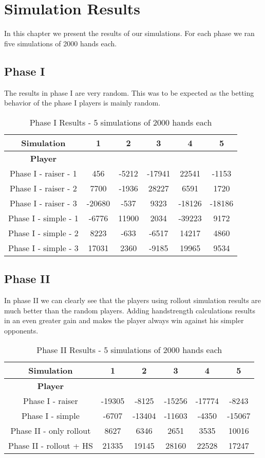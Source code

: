 \pagebreak

\section{Simulation Results}
In this chapter we present the results of our simulations. For each phase we ran five simulations of 2000 hands each.

\subsection{Phase I}
The results in phase I are very random. This was to be expected as the betting behavior of the phase I players is mainly
random.

\begin{table}[!h]
\center
\caption{Phase I Results - 5 simulations of 2000 hands each}
\begin{tabular}{ c | c c c c c}
    \textbf{Simulation} & 1 & 2 & 3 & 4 & 5 \\
    \hline
    \textbf{Player} \\
    Phase I - raiser - 1 & 456 & -5212 & -17941 & 22541  & -1153\\
    Phase I - raiser - 2 & 7700 & -1936 & 28227 & 6591   & 1720\\
    Phase I - raiser - 3 & -20680 & -537 & 9323 & -18126 & -18186\\
    Phase I - simple - 1 & -6776 & 11900 & 2034 & -39223 & 9172\\
    Phase I - simple - 2 & 8223 & -633 & -6517 & 14217   & 4860\\
    Phase I - simple - 3 & 17031 & 2360 & -9185 & 19965  & 9534\\
\end{tabular}
\end{table}

\subsection{Phase II}
In phase II we can clearly see that the players using rollout simulation results are much better than the random
players. Adding handstrength calculations results in an even greater gain and makes the player always win against his
simpler opponents.

\begin{table}[!h]
\center
\caption{Phase II Results - 5 simulations of 2000 hands each}
\begin{tabular}{ c | c c c c c}
    \textbf{Simulation} & 1 & 2 & 3 & 4 & 5 \\
    \hline
    \textbf{Player} \\
    Phase I - raiser        & -19305 & -8125 & -15256 & -17774 & -8243\\
    Phase I - simple        & -6707 & -13404 & -11603 & -4350  & -15067\\
    Phase II - only rollout & 8627  & 6346  & 2651    & 3535   & 10016\\
    Phase II - rollout + HS & 21335 & 19145 & 28160   & 22528  & 17247\\
\end{tabular}
\end{table}


